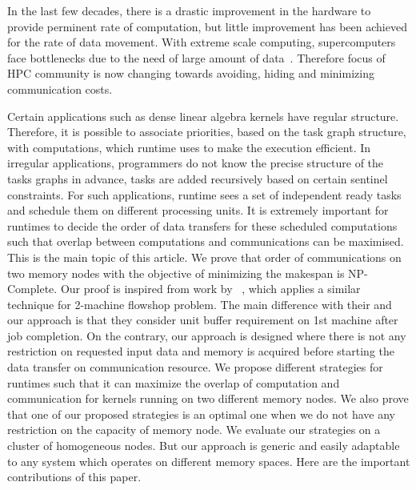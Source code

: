 \documentclass[sigconf]{acmart}
\begin{document}
	
	
	
	In the last few decades, there is a drastic improvement in the hardware to provide perminent rate of computation, but little improvement has been achieved for the rate of data movement. With extreme scale computing, supercomputers face bottlenecks due to the need of large amount of data~\cite{ascaccommitteereport2014,yelick2016}. Therefore focus of HPC community is now changing towards avoiding, hiding and minimizing communication costs.
	
	
	Certain applications such as dense linear algebra kernels have regular structure. Therefore, it is possible to associate priorities, based on the task graph structure, with computations, which runtime uses to make the execution efficient. In irregular applications, programmers do not know the precise structure of the tasks graphs in advance, tasks are added recursively based on certain sentinel constraints. For such applications, runtime sees a set of independent ready tasks and schedule them on different processing units. It is extremely important for runtimes to decide the order of data transfers for these scheduled computations such that overlap between computations and communications can be maximised. This is the main topic of this article. We prove that order of communications on two memory nodes  with the objective of minimizing the makespan is  NP-Complete. Our proof is inspired from work by ~\cite{Papadimitriou:1980:FSL:322203.322213}, which applies a similar technique for 2-machine flowshop problem. The main difference with their and our approach is that they consider unit buffer requirement on 1st machine after job completion. On the contrary, our approach is designed where there is not any restriction on requested input data and memory is acquired before starting the data transfer on communication resource. We propose different strategies for runtimes such that it can maximize the overlap of computation and communication for kernels running on two different memory nodes. We also prove that one of our proposed strategies is an optimal one when we do not have any restriction on the capacity of memory node.  We evaluate our strategies on a cluster of homogeneous nodes. But our approach is generic and easily adaptable to any system which operates on different memory spaces. Here are the important contributions of this paper.
\end{document}
